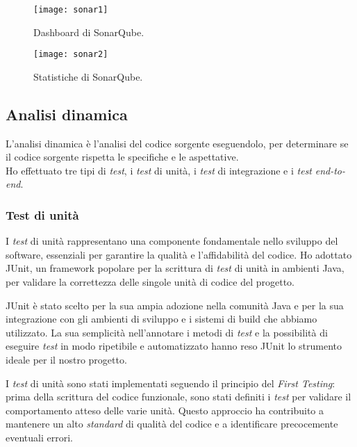 \begin{figure}[h]
  \centering
  \begin{minipage}{0.49\textwidth}
      \centering
      \texttt{[image: sonar1]} 
      \caption{Dashboard di SonarQube.}
      \label{fig:sonar1}
  \end{minipage}\hfill
  \begin{minipage}{0.49\textwidth}
    \centering
    \texttt{[image: sonar2]}
    \caption{Statistiche di SonarQube.}
    \label{fig:sonar2}
  \end{minipage}
\end{figure}

\subsection*{Analisi dinamica}
L'analisi dinamica è l'analisi del codice sorgente eseguendolo, per determinare se il codice sorgente rispetta
le specifiche e le aspettative.\\
Ho effettuato tre tipi di \textit{test}, i \textit{test} di unità, i \textit{test} di integrazione e i \textit{test} \textit{end-to-end}.\\
\subsubsection*{Test di unità}
I \textit{test} di unità rappresentano una componente fondamentale nello sviluppo del software, 
essenziali per garantire la qualità e l'affidabilità del codice. 
Ho adottato JUnit, un framework popolare per la scrittura di \textit{test} di unità in ambienti Java, 
per validare la correttezza delle singole unità di codice del progetto.

JUnit è stato scelto per la sua ampia adozione nella comunità Java e per la sua integrazione con gli ambienti di sviluppo e i sistemi di build che abbiamo utilizzato. La sua semplicità nell'annotare i metodi di \textit{test} e la possibilità di eseguire \textit{test} in modo ripetibile e automatizzato hanno reso JUnit lo strumento ideale per il nostro progetto.

I \textit{test} di unità sono stati implementati seguendo il principio del \textit{First Testing}: 
prima della scrittura del codice funzionale, sono stati definiti i \textit{test} per validare il comportamento atteso delle varie unità. 
Questo approccio ha contribuito a mantenere un alto \textit{standard} di qualità del codice e a identificare precocemente eventuali errori.

